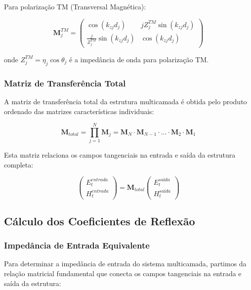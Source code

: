 \documentclass[11pt,a4paper]{article}
\begin{document}
Para polarização TM (Transversal Magnética):

\begin{equation}
\mathbf{M}_j^{TM} = \begin{pmatrix}
\cos(k_{zj}d_j) & j Z_j^{TM} \sin(k_{zj}d_j) \\
\frac{j}{Z_j^{TM}} \sin(k_{zj}d_j) & \cos(k_{zj}d_j)
\end{pmatrix}
\end{equation}

onde $Z_j^{TM} = \eta_j \cos\theta_j$ é a impedância de onda para polarização TM.

\subsubsection{Matriz de Transferência Total}

A matriz de transferência total da estrutura multicamada é obtida pelo produto ordenado das matrizes características individuais:

\begin{equation}
\mathbf{M}_{total} = \prod_{j=1}^{N} \mathbf{M}_j = \mathbf{M}_N \cdot \mathbf{M}_{N-1} \cdot \ldots \cdot \mathbf{M}_2 \cdot \mathbf{M}_1
\end{equation}

Esta matriz relaciona os campos tangenciais na entrada e saída da estrutura completa:

\begin{equation}
\begin{pmatrix}
E_t^{entrada} \\
H_t^{entrada}
\end{pmatrix} = \mathbf{M}_{total} \begin{pmatrix}
E_t^{saída} \\
H_t^{saída}
\end{pmatrix}
\end{equation}

\subsection{Cálculo dos Coeficientes de Reflexão}

\subsubsection{Impedância de Entrada Equivalente}

Para determinar a impedância de entrada do sistema multicamada, partimos da relação matricial fundamental que conecta os campos tangenciais na entrada e saída da estrutura:
\end{document}

